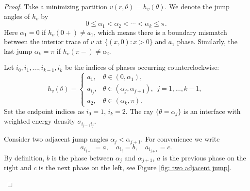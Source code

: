 \documentclass[leqno,11pt]{amsart}
\let\al=\alpha
\theoremstyle{remark}
\begin{document}
\begin{proof}
    Take a minimizing partition $v(r,\theta)=h_v(\theta)$. We denote the jump angles of $h_v$ by 
    \begin{equation*}
        0\leq \al_1<\al_2<\cdots<\al_k\leq \pi.
    \end{equation*}
    Here $\al_1=0$ if $h_v(0+)\neq a_1$, which means there is a boundary mismatch between the interior trace of $v$ at $\{(x,0):x>0\}$ and $a_1$ phase. Similarly, the last jump $\al_k=\pi$ if $h_v(\pi-)\neq a_2$. 

    Let $i_0, i_1,..., i_{k-1},i_{k}$ be the indices of phases occurring counterclockwise:
    \begin{equation*}
        h_v(\theta)=\begin{cases}
         a_1,&\theta\in(0,\al_1),\\
         a_{i_j},&\theta\in (\al_{j}, \al_{j+1}),\ \ j=1,...,k-1,\\
         a_2, &\theta\in (\al_{k},\pi).
        \end{cases}
    \end{equation*}
   Set the endpoint indices as $i_0=1$, $i_k=2$. The ray $\{\theta=\al_j\}$ is an interface with weighted energy density $\sigma_{i_{j-1}i_{j}}$.

    Consider two adjacent jump angles $\al_j<\al_{j+1}$. For convenience we write 
    \begin{equation*}
    a_{i_{j-1}}=a,\quad a_{i_j}=b,\quad a_{i_{j+1}}=c.    
    \end{equation*}
    By definition, $b$ is the phase between $\al_j$ and $\al_{j+1}$, $a$ is the previous phase on the right and $c$ is the next phase on the left, see Figure \ref{fig: two adjacent jump}. 

    
\begin{figure}[htb!]
    \centering
\end{figure}
\end{proof}
\end{document}

